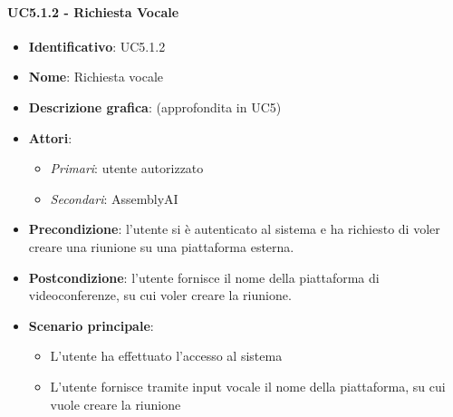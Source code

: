 \paragraph{UC5.1.2 - Richiesta Vocale}
\begin{itemize}
   \item \textbf{Identificativo}: UC5.1.2
   \item \textbf{Nome}: Richiesta vocale
   \item \textbf{Descrizione grafica}: (approfondita in UC5)
   \item \textbf{Attori}:
   \begin{itemize} 
       \item \textit{Primari}: utente autorizzato
       \item \textit{Secondari}: AssemblyAI
   \end{itemize}
       \item \textbf{Precondizione}: l'utente si è autenticato al sistema e ha richiesto di voler creare una riunione su una piattaforma esterna.
       \item \textbf{Postcondizione}: l'utente fornisce il nome della piattaforma di videoconferenze, su cui voler creare la riunione.
    \item \textbf{Scenario principale}: 
       \begin{itemize}
           \item L'utente ha effettuato l'accesso al sistema 
           \item L'utente fornisce tramite input vocale il nome della piattaforma, su cui vuole creare la riunione
       \end{itemize}
\end{itemize}

